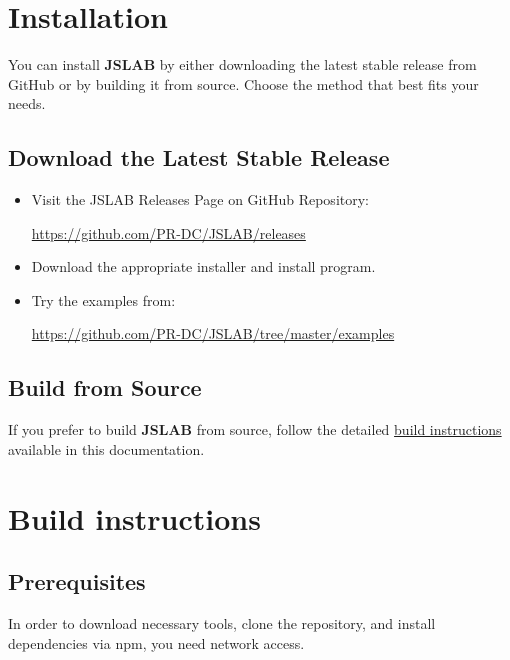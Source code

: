 \documentclass[12pt,a4paper]{article}
\begin{document}
\section{Installation}

You can install \textbf{JSLAB} by either downloading the latest stable release from GitHub or by building it from source. Choose the method that best fits your needs.

\subsection{Download the Latest Stable Release}
\begin{itemize}
  \item Visit the JSLAB Releases Page on GitHub Repository:

  \url{https://github.com/PR-DC/JSLAB/releases}

  \item Download the appropriate installer and install program.

  \item Try the examples from:

  \url{https://github.com/PR-DC/JSLAB/tree/master/examples}

\end{itemize}

\subsection{Build from Source}

If you prefer to build \textbf{JSLAB} from source, follow the detailed \hyperref[build-instructions]{build instructions} available in this documentation.

\section{Build instructions}
\label{build-instructions}

\subsection{Prerequisites}

In order to download necessary tools, clone the repository, and install dependencies via npm, you need network access.
\end{document}
